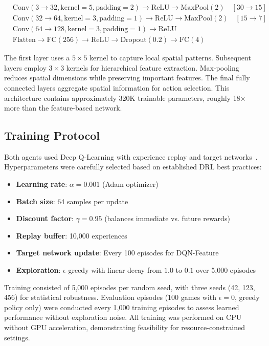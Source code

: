 \documentclass[10pt,a4paper,twocolumn]{article}
\begin{document}
\begin{align*}
&\text{Conv}(3 \to 32, \text{kernel}=5, \text{padding}=2) \to \text{ReLU} \to \text{MaxPool}(2) \quad [30 \to 15] \\
&\text{Conv}(32 \to 64, \text{kernel}=3, \text{padding}=1) \to \text{ReLU} \to \text{MaxPool}(2) \quad [15 \to 7] \\
&\text{Conv}(64 \to 128, \text{kernel}=3, \text{padding}=1) \to \text{ReLU} \\
&\text{Flatten} \to \text{FC}(256) \to \text{ReLU} \to \text{Dropout}(0.2) \to \text{FC}(4)
\end{align*}

The first layer uses a $5 \times 5$ kernel to capture local spatial patterns. Subsequent layers employ $3 \times 3$ kernels for hierarchical feature extraction. Max-pooling reduces spatial dimensions while preserving important features. The final fully connected layers aggregate spatial information for action selection. This architecture contains approximately 320K trainable parameters, roughly 18× more than the feature-based network.

\subsection{Training Protocol}

Both agents used Deep Q-Learning with experience replay and target networks~\cite{watkins1992q}. Hyperparameters were carefully selected based on established DRL best practices:

\begin{itemize}
    \item \textbf{Learning rate}: $\alpha = 0.001$ (Adam optimizer)
    \item \textbf{Batch size}: 64 samples per update
    \item \textbf{Discount factor}: $\gamma = 0.95$ (balances immediate vs. future rewards)
    \item \textbf{Replay buffer}: 10,000 experiences
    \item \textbf{Target network update}: Every 100 episodes for DQN-Feature
    \item \textbf{Exploration}: $\epsilon$-greedy with linear decay from $1.0$ to $0.1$ over 5,000 episodes
\end{itemize}

Training consisted of 5,000 episodes per random seed, with three seeds (42, 123, 456) for statistical robustness. Evaluation episodes (100 games with $\epsilon = 0$, greedy policy only) were conducted every 1,000 training episodes to assess learned performance without exploration noise. All training was performed on CPU without GPU acceleration, demonstrating feasibility for resource-constrained settings.
\end{document}
